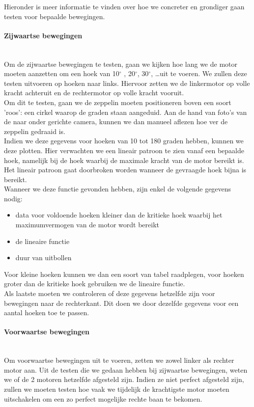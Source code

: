 \documentclass[eind]{penoverslag}
\begin{document}
Hieronder is meer informatie te vinden over hoe we concreter en grondiger gaan testen voor bepaalde bewegingen. \\

\paragraph{Zijwaartse bewegingen} ~\\ 
Om de zijwaartse bewegingen te testen, gaan we kijken hoe lang we de motor moeten aanzetten om een hoek van 10$^\circ$ , 20$^\circ$, 30$^\circ$, \ldots uit te voeren. We zullen deze testen uitvoeren op hoeken naar links. Hiervoor zetten we de linkermotor op volle kracht achteruit en de rechtermotor op volle kracht vooruit. \\

Om dit te testen, gaan we de zeppelin moeten positioneren boven een soort 'roos': een cirkel waarop de graden staan aangeduid. Aan de hand van foto's van de naar onder gerichte camera, kunnen we dan manueel aflezen hoe ver de zeppelin gedraaid is. \\

Indien we deze gegevens voor hoeken van 10 tot 180 graden hebben, kunnen we deze plotten. Hier verwachten we een lineair patroon te zien vanaf een bepaalde hoek, namelijk bij de hoek waarbij de maximale kracht van de motor bereikt is. Het lineair patroon gaat doorbroken worden wanneer de gevraagde hoek bijna is bereikt. \\

Wanneer we deze functie gevonden hebben, zijn enkel de volgende gegevens nodig:
\begin{itemize}
	\item data voor voldoende hoeken kleiner dan de kritieke hoek waarbij het maximumvermogen van de motor wordt bereikt
	\item de lineaire functie
	\item duur van uitbollen
\end{itemize}
Voor kleine hoeken kunnen we dan een soort van tabel raadplegen, voor hoeken groter dan de kritieke hoek gebruiken we de lineaire functie. \\

Als laatste moeten we controleren of deze gegevens hetzelfde zijn voor bewegingen naar de rechterkant.  Dit doen we door dezelfde gegevens voor een aantal hoeken toe te passen. \\

\paragraph{Voorwaartse bewegingen} ~\\ 
Om voorwaartse bewegingen uit te voeren, zetten we zowel linker als rechter motor aan. Uit de testen die we gedaan hebben bij zijwaartse bewegingen, weten we of de 2 motoren hetzelfde afgesteld zijn. Indien ze niet perfect afgesteld zijn, zullen we moeten testen hoe vaak we tijdelijk de krachtigste motor moeten uitschakelen om een zo perfect mogelijke rechte baan te bekomen. \\
\end{document}
